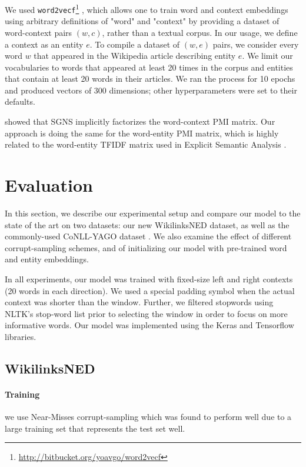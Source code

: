 \documentclass[11pt]{article}
\begin{document}
	We used \texttt{word2vecf}\footnote{\url{http://bitbucket.org/yoavgo/word2vecf}} \cite{levy2014dependency}, which allows one to train word and context embeddings using arbitrary definitions of "word" and "context" by providing a dataset of word-context pairs $(w,c)$, rather than a textual corpus. In our usage, we define a context as an entity $e$. To compile a dataset of $(w,e)$ pairs, we consider every word $w$ that appeared in the Wikipedia article describing entity $e$. We limit our vocabularies to words that appeared at least 20 times in the corpus and entities that contain at least 20 words in their articles. We ran the process for 10 epochs and produced vectors of 300 dimensions; other hyperparameters were set to their defaults.
	
	 showed that SGNS implicitly factorizes the word-context PMI matrix. Our approach is doing the same for the word-entity PMI matrix, which is highly related to the word-entity TFIDF matrix used in Explicit Semantic Analysis \cite{gabrilovich2007computing}.
	
	\section{Evaluation}
	\label{experiments}
	
	In this section, we describe our experimental setup and compare our model to the state of the art on two datasets: our new WikilinksNED dataset, as well as the commonly-used CoNLL-YAGO dataset \cite{hoffart2011robust}. We also examine the effect of different corrupt-sampling schemes, and of initializing our model with pre-trained word and entity embeddings.
	
	In all experiments, our model was trained with fixed-size left and right contexts (20 words in each direction). We used a special padding symbol when the actual context was shorter than the window. Further, we filtered stopwords using NLTK's stop-word list prior to selecting the window in order to focus on more informative words. Our model was implemented using the Keras \cite{chollet2015} and Tensorflow \cite{tensorflow2015-whitepaper} libraries.
	
	\subsection{WikilinksNED}
	
	\paragraph{Training} we use Near-Misses corrupt-sampling which was found to perform well due to a large training set that represents the test set well.
	
\end{document}
